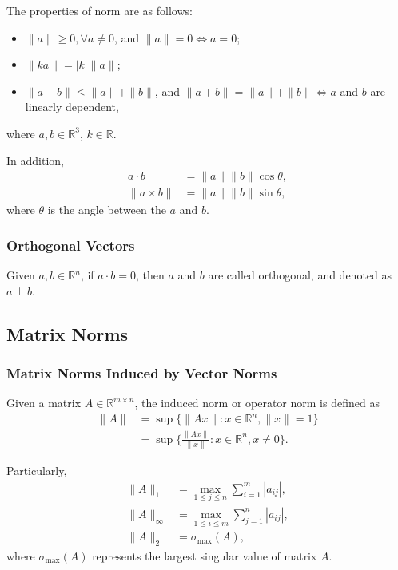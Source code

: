 The properties of norm are as follows:
\begin{itemize}
  \item $ \| a \| \geq 0, \forall a \neq 0$, and $\| a \| = 0 \iff a = 0$;
  \item $ \| k a \| = |k| \| a \|$;
  \item $ \| a + b \| \leq \| a \| + \| b \|$, and $\| a + b \| = \| a \| + \| b \| \iff a $ and $b$ are linearly dependent,
\end{itemize}
where $a, b\in \mathbb{R}^3$, $k \in \mathbb{R}$.

In addition, 
\begin{align*}
a \cdot b & = \| a \|  \| b \| \cos \theta,  \\
\| a \times b \| & =  \| a \|  \| b \| \sin \theta,
\end{align*}
where $\theta$ is the angle between the $a$ and $b$.

\subsubsection*{Orthogonal Vectors}
Given $a, b\in \mathbb{R}^n$, if $a \cdot b = 0$, then $a$ and $b$ are called orthogonal, and denoted as $ a \perp b$.


\subsection*{Matrix Norms}

\subsubsection*{Matrix Norms Induced by Vector Norms}
Given a matrix $A \in \mathbb{R}^{m \times n}$, the induced norm or operator norm is defined as
\begin{align*}
\| A \| & = \sup \{ \| Ax\| : x \in \mathbb{R}^n, \|x\| = 1  \}   \\
	& = \sup \{ \frac{\| Ax\|}{\| x \|} : x \in \mathbb{R}^n, x \neq 0  \}.
\end{align*}

Particularly,
\begin{align*}
\| A \|_1 & = \max_{1 \leq j \leq n} \sum_{i=1}^{m} |a_{ij}|,   \\
\| A \|_{\infty} & = \max_{1 \leq i \leq m} \sum_{j=1}^{n} |a_{ij}|,   \\
\| A \|_2 & = \sigma_{\max} (A),
\end{align*}
where $\sigma_{\max} (A)$ represents the largest singular value of matrix $A$.

